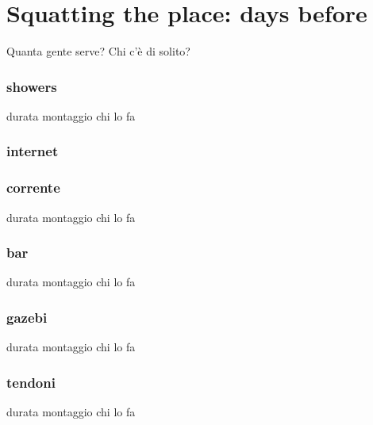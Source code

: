 \chapter{Squatting the place: days before}
Quanta gente serve? Chi c'è di solito?

\subsection{showers}
durata montaggio
chi lo fa

\subsection{internet}

\subsection{corrente}
durata montaggio
chi lo fa

\subsection{bar}
durata montaggio
chi lo fa

\subsection{gazebi}
durata montaggio
chi lo fa

\subsection{tendoni}
durata montaggio
chi lo fa
